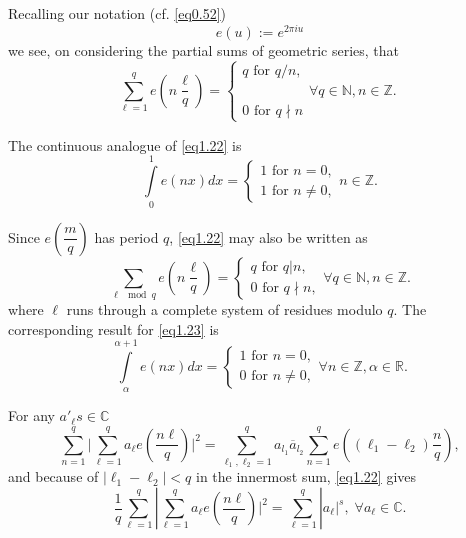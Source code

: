 Recalling our notation (cf. \eqref{eq0.52})
\begin{equation*} %
e(u):=e^{2\pi iu} \tag{1.21}\label{eq1.21}
\end{equation*}
we see, on considering the partial sums of geometric series, that
\begin{equation*} %
\sum^q_{\ell=1}e(n\frac{\ell}{q})= 
\begin{cases}
q \text{  for } q/n, \\
\hspace{2cm}\forall q\in \mathbb{N}, n\in \mathbb{Z}. \\
0 \text{  for } q \nmid n
\end{cases}\tag{1.22}\label{eq1.22}
\end{equation*}

The continuous analogue of \eqref{eq1.22} is 
\begin{equation*} %
\int\limits_0^1 e(nx)dx=
\begin{cases}
1 \text{  for }n = 0, \\
1 \text{  for }n \neq 0, 
\end{cases}n\in\mathbb{Z}. \tag{1.23}\label{eq1.23}
\end{equation*}

Since $e(\dfrac{m}{q})$ has period $q$, \eqref{eq1.22} may also be
written as   
\begin{equation*} %
\sum_{\ell \mod q}e(n\frac{\ell}{q})=
\begin{cases}
q \text{  for } q|n, \\
0 \text{  for } q \nmid n, 
\end{cases}\forall q\in \mathbb{N},
n\in\mathbb{Z}.\tag{1.24}\label{eq1.24} 
\end{equation*}
where $\ell$ runs through a complete system of residues modulo
$q$. The corresponding result for \eqref{eq1.23} is  
\begin{equation*} %
\int\limits^{\alpha+1}_{\alpha} e(nx)dx=
\begin{cases}
1 \text{  for }n = 0, \\
0 \text{  for }n \neq 0, 
\end{cases}\forall n\in\mathbb{Z},
\alpha\in\mathbb{R}.\tag{1.25}\label{eq1.25} 
\end{equation*}

For any $a'_\ell s \in \mathbb{C}$ 
\begin{equation*}%
\sum^q_{n=1}\Big|\sum^q_{\ell=1} a_\ell e(\frac{n\ell}{q})\Big|^2 =
\sum^q_{\ell_1,\ell_2=1} a_{l_1} \overline{a}_{l_2} \sum^q_{n=1}
e((\ell_1-\ell_2)\frac{n}{q}),  \tag{1.26}\label{eq1.26} 
\end{equation*}
and because of $|\ell_1-\ell_2|<q$ in the innermost sum,
\eqref{eq1.22} gives  
\begin{equation*}%
\frac{1}{q}\sum^q_{\ell=1}|\sum^q_{\ell=1} a_\ell
e(\frac{n\ell}{q})\Big|^2 = \sum^q_{\ell=1} |a_\ell |^s, \; \forall
a_\ell \in \mathbb{C}. \tag{1.27}\label{eq1.27} 
\end{equation*}

